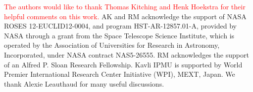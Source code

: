 \documentclass[twocolumn,useAMS,usenatbib]{mn2e}
\newcommand{\rachel}[1]{{\textcolor{red}{#1}}}
\newcommand{\arun}[1]{{\textcolor{blue}{#1}}}
\newcommand{\claire}[1]{{\textcolor{magenta}{#1}}}
\begin{document}
\rachel{The authors would like to thank Thomas Kitching and Henk
  Hoekstra for their helpful comments on this work.}
AK and RM acknowledge the support of NASA ROSES 12-EUCLID12-0004, and
program HST-AR-12857.01-A, provided by NASA through a grant from the
Space Telescope Science Institute, which is operated by the
Association of Universities for Research in Astronomy, Incorporated,
under NASA contract NAS5-26555. RM acknowledges the support of an Alfred P. Sloan Research Fellowship. 
Kavli IPMU is supported by World Premier International Research Center Initiative (WPI), MEXT, Japan.
We thank Alexie Leauthaud for 
many useful discussions.




\end{document}
